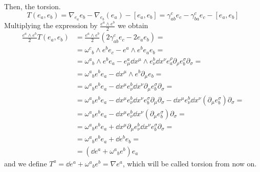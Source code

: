 \documentclass[a4paper,12pt]{book}
\begin{document}
Then, the torsion.
\[T(e_a,e_b)=\nabla_{e_a}e_b-\nabla_{e_b}(e_a)-[e_a,e_b]=\gamma_{ab}^ce_c-\gamma_{ba}^ce_c-[e_a,e_b]\]
Multiplying the expression by $\frac{e^a\wedge e^b}{2}$ we obtain
\begin{align*}
\frac{e^a\wedge e^b}{2}T(e_a,e_b)&=\frac{e^a\wedge e^b}{2}(2\gamma_{ab}^ce_c-2e_ae_b)=\\
&=\omega^c{}_b\wedge e^be_c-e^a\wedge e^be_ae_b=\\
&=\omega^a{}_b\wedge e^be_a-e_\mu^a\dd x^\mu\wedge e_\nu^b\dd x^\nu e^\rho_a\partial_\rho e^\sigma_b\partial_\sigma=\\
&=\omega^a{}_be^be_a-\dd x^\mu\wedge e^b\partial_\mu e_b=\\
&=\omega^a{}_be^be_a-\dd x^\mu e^b_\nu\dd x^\nu \partial_\mu e^\sigma_b\partial_\sigma=\\
&=\omega^a{}_be^be_a-\dd x^\mu e^b_\nu \dd x^\nu e^\sigma_b\partial_\mu\partial_\sigma-\dd x^\mu e^b_\nu \dd x^\nu (\partial_\mu e^\sigma_b)\partial_\sigma=\\
&=\omega^a{}_be^be_a-\dd x^\mu e^b_\nu \dd x^\nu (\partial_\mu e^\sigma_b)\partial_\sigma=\\
&=\omega^a{}_be^be_a+\dd x^\mu\partial_\mu e^b_\nu\dd x^\nu e^\sigma_b\partial_\sigma=\\
&=\omega^a{}_be^be_a+\dd e^be_b=\\
&=(\dd e^a+\omega^a{}_be^b)e_a
\end{align*}
and we define $T^a=\dd e^a+\omega^a{}_be^b=\nabla e^a$, which will be called torsion from now on.
\end{document}

